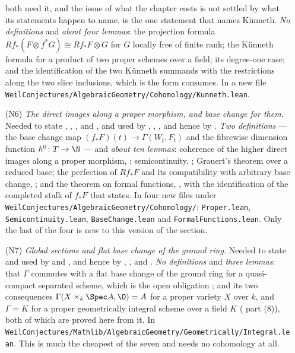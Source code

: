 \begin{enumerate}
   both need it, and the issue of what the chapter
  costs is not settled by what its statements happen to name.
   is the one statement that names K\"unneth.
  \emph{No definitions} and \emph{about four lemmas}: the projection formula
  $Rf_*(F\otimes f^*G)\cong Rf_*F\otimes G$ for $G$ locally free of finite
  rank; the K\"unneth formula for a product of two proper schemes over a
  field; its degree-one case; and the identification of the two K\"unneth
  summands with the restrictions along the two slice inclusions, which is the
  form  consumes.  In a new file
  \texttt{WeilConjectures/AlgebraicGeometry/Cohomology/Kunneth.lean}.
  \item[(N6)] \emph{The direct images along a proper morphism, and base
  change for them.}  Needed to state
  ,
  , ,
   and , and
  used by , ,
  ,  and hence
  by .  \emph{Two
  definitions} --- the base change map $(f_*F)(t)\to\Gamma(W_t,F_t)$ and the
  fibrewise dimension function $h^0\colon T\to\N$ --- and \emph{about ten
  lemmas}: coherence of the higher direct images along a proper morphism,
  ; semicontinuity, ; Grauert's
  theorem over a reduced base; the perfection of $Rf_*F$ and its compatibility
  with arbitrary base change, ; and the theorem on formal
  functions, , with the identification of the completed
  stalk of $f_*F$ that  states.  In four new
  files under \texttt{WeilConjectures/AlgebraicGeometry/Cohomology/}:
  \texttt{Proper.lean}, \texttt{Semicontinuity.lean}, \texttt{BaseChange.lean}
  and \texttt{FormalFunctions.lean}.  Only the last of the four is new to this
  version of the section.
  \item[(N7)] \emph{Global sections and flat base change of the ground ring.}
  Needed to state  and used
  by  and
  , and hence by
  , ,
   and .
  \emph{No definitions} and \emph{three lemmas}: that $\Gamma$ commutes with a
  flat base change of the ground ring for a quasi-compact separated scheme,
  which is the open obligation
  ; and its two consequences
  $\Gamma(X\times_k\Spec A,\O)=A$ for a proper variety $X$ over $k$, and
  $\Gamma=K$ for a proper geometrically integral scheme over a field $K$
  ( part (8)), both of which are proved here from it.  In
  \texttt{WeilConjectures/Mathlib/AlgebraicGeometry/Geometrically/Integral.lean}.
  This is much the cheapest of the seven and needs no cohomology at all.
\end{enumerate}

